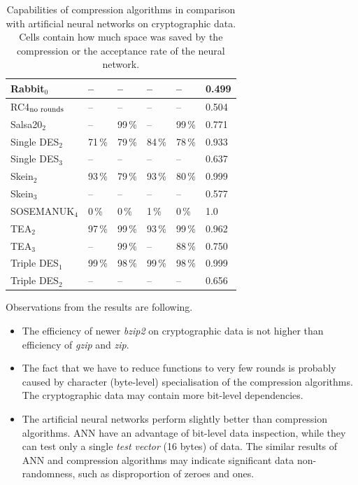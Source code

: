 \documentclass[
    digital,    %
    oneside,    %
    color,
    11pt,
    nocover,
    notable,
    nolof,
    nolot,
]{fithesis3}
\newcommand{\fd}{\cellcolor{red!25}}
\newcommand{\fn}{}
\begin{document}
\begin{table}[t]
\begin{tabular}{@{}l|lllll}
Rabbit$_{0}$                     & --     \fn & --     \fn & --     \fn & --     \fn & 0.499 \fn \\ \hline
RC4$_{\textnormal{no rounds}}$   & --     \fn & --     \fn & --     \fn & --     \fn & 0.504 \fn \\ \hline
Salsa20$_{2}$                    & --     \fn & 99\,\% \fd & --     \fn & 99\,\% \fd & 0.771 \fd \\ \hline
Single DES$_{2}$                 & 71\,\% \fd & 79\,\% \fd & 84\,\% \fd & 78\,\% \fd & 0.933 \fd \\
Single DES$_{3}$                 & --     \fn & --     \fn & --     \fn & --     \fn & 0.637 \fd \\ \hline
Skein$_{2}$                      & 93\,\% \fd & 79\,\% \fd & 93\,\% \fd & 80\,\% \fd & 0.999 \fd \\ \hline
Skein$_{3}$                      & --     \fn & --     \fn & --     \fn & --     \fn & 0.577 \fd \\ \hline
SOSEMANUK$_{4}$                  & 0\,\%  \fd & 0\,\%  \fd & 1\,\%  \fd & 0\,\%  \fd & 1.0   \fd \\ \hline
TEA$_{2}$                        & 97\,\% \fd & 99\,\% \fd & 93\,\% \fd & 99\,\% \fd & 0.962 \fd \\
TEA$_{3}$                        & --     \fn & 99\,\% \fd & --     \fn & 88\,\% \fd & 0.750 \fd \\ \hline
Triple DES$_{1}$                 & 99\,\% \fd & 98\,\% \fd & 99\,\% \fd & 98\,\% \fd & 0.999 \fd \\
Triple DES$_{2}$                 & --     \fn & --     \fn & --     \fn & --     \fn & 0.656 \fd

\end{tabular}

\caption{Capabilities of compression algorithms in comparison with artificial neural networks on cryptographic data. Cells contain how much space was saved by the compression or the acceptance rate of the neural network.}
\label{table:res-compression}
\end{table}

Observations from the results are following.

\begin{itemize}
    \item The efficiency of newer \textit{bzip2} on cryptographic data is not higher than efficiency of \textit{gzip} and \textit{zip}.
    \item The fact that we have to reduce functions to very few rounds is probably caused by character (byte-level) specialisation of the compression algorithms. The cryptographic data may contain more bit-level dependencies.
    \item The artificial neural networks perform slightly better than compression algorithms. ANN have an advantage of bit-level data inspection, while they can test only a single \textit{test vector} (16 bytes) of data. The similar results of ANN and compression algorithms may indicate significant data non-randomness, such as disproportion of zeroes and ones.
\end{itemize}
\end{document}
